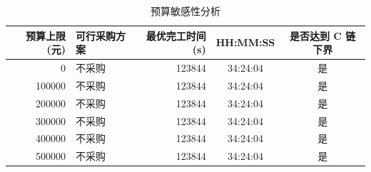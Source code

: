 \begin{table}[!htbp]
  \centering
  \caption{预算敏感性分析}
  \label{tab:budget-sensitivity}
  \renewcommand{\arraystretch}{1.2}
  \begin{tabularx}{\textwidth}{r X r c c}
    \toprule
    预算上限(元) & 可行采购方案 & 最优完工时间(s) & HH:MM:SS & 是否达到 C 链下界 \\
    \midrule
    0 & 不采购 & 123844 & 34:24:04 & 是 \\
    100000 & 不采购 & 123844 & 34:24:04 & 是 \\
    200000 & 不采购 & 123844 & 34:24:04 & 是 \\
    300000 & 不采购 & 123844 & 34:24:04 & 是 \\
    400000 & 不采购 & 123844 & 34:24:04 & 是 \\
    500000 & 不采购 & 123844 & 34:24:04 & 是 \\
    \bottomrule
  \end{tabularx}
\end{table}
